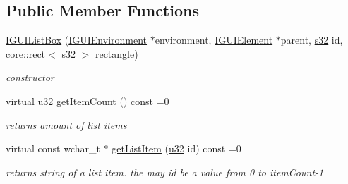 \subsection*{Public Member Functions}
\begin{DoxyCompactItemize}
\item 
\mbox{\label{classirr_1_1gui_1_1IGUIListBox_a6f6e6a84f3d2035a0874eb9f4a4d52ef}} 
\hyperlink{classirr_1_1gui_1_1IGUIListBox_a6f6e6a84f3d2035a0874eb9f4a4d52ef}{I\+G\+U\+I\+List\+Box} (\hyperlink{classirr_1_1gui_1_1IGUIEnvironment}{I\+G\+U\+I\+Environment} $\ast$environment, \hyperlink{classirr_1_1gui_1_1IGUIElement}{I\+G\+U\+I\+Element} $\ast$parent, \hyperlink{namespaceirr_ac66849b7a6ed16e30ebede579f9b47c6}{s32} id, \hyperlink{classirr_1_1core_1_1rect}{core\+::rect}$<$ \hyperlink{namespaceirr_ac66849b7a6ed16e30ebede579f9b47c6}{s32} $>$ rectangle)
\begin{DoxyCompactList}\small\item\em constructor \end{DoxyCompactList}\item 
\mbox{\label{classirr_1_1gui_1_1IGUIListBox_a9ae7e4858dd1dee26efab7e7c9c94ab7}} 
virtual \hyperlink{namespaceirr_a0416a53257075833e7002efd0a18e804}{u32} \hyperlink{classirr_1_1gui_1_1IGUIListBox_a9ae7e4858dd1dee26efab7e7c9c94ab7}{get\+Item\+Count} () const =0
\begin{DoxyCompactList}\small\item\em returns amount of list items \end{DoxyCompactList}\item 
\mbox{\label{classirr_1_1gui_1_1IGUIListBox_af68ea08c93b0959ea464146bc1f4d82f}} 
virtual const wchar\+\_\+t $\ast$ \hyperlink{classirr_1_1gui_1_1IGUIListBox_af68ea08c93b0959ea464146bc1f4d82f}{get\+List\+Item} (\hyperlink{namespaceirr_a0416a53257075833e7002efd0a18e804}{u32} id) const =0
\begin{DoxyCompactList}\small\item\em returns string of a list item. the may id be a value from 0 to item\+Count-\/1 \end{DoxyCompactList}\item 
\mbox{\label{classirr_1_1gui_1_1IGUIListBox_a298dbba8da28248b563a906c520dc3be}} 

\end{DoxyCompactItemize}
